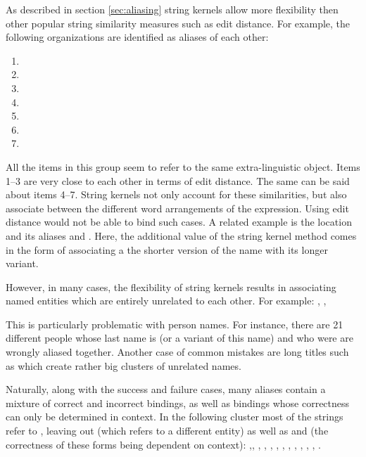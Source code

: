 As described in section \ref{sec:aliasing} string kernels allow more flexibility then other popular string similarity measures such as edit distance.
For example, the following organizations are identified as aliases of each other:
\begin{enumerate}
\item  {}
\item  {}
\item  {}
\item  {}
\item  {}
\item  {}
\item  {}
\end{enumerate}
All the items in this group seem to refer to the same extra-linguistic object. Items 1--3 are very close to each other in terms of edit distance.
The same can be said about items 4--7. String kernels not only account for these similarities, but also associate between the different word arrangements of the expression. Using edit distance would not be able to bind such cases. A related example is the location  and its aliases 
 and . Here, the additional value of the string kernel method comes in the form of associating a the shorter version of the
name with its longer variant. 

However, in many cases, the flexibility of string kernels results in associating named entities which are entirely unrelated to each other. For example: , , 

This is particularly problematic with person names. For instance, there are 21 different people whose last name is  (or a variant of this name) and who were are wrongly aliased together. Another case of common mistakes are long titles such as  which create rather big clusters of unrelated names.   
 
Naturally, along with the success and failure cases, many aliases contain a mixture of correct and incorrect bindings, as well as bindings whose correctness can only be determined in context. In the following cluster most of the strings refer to , leaving out  (which refers to a different entity) as well as  and  (the correctness of these forms being dependent on context): ,, , , , , , , , , , , .

